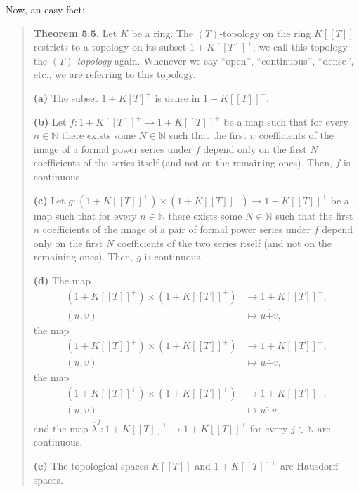\documentclass[numbers=enddot,12pt,final,onecolumn,notitlepage]{scrartcl}%
\begin{document}
Now, an easy fact:

\begin{quote}
\textbf{Theorem 5.5.} Let $K$ be a ring. The $\left(  T\right)  $-topology on
the ring $K\left[  \left[  T\right]  \right]  $ restricts to a topology on its
subset $1+K\left[  \left[  T\right]  \right]  ^{+}$; we call this topology the
$\left(  T\right)  $\textit{-topology} again. Whenever we say ``open'',
``continuous'', ``dense'', etc., we are referring to this topology.

\textbf{(a)} The subset $1+K\left[  T\right]  ^{+}$ is dense in $1+K\left[
\left[  T\right]  \right]  ^{+}$.

\textbf{(b)} Let $f:1+K\left[  \left[  T\right]  \right]  ^{+}\rightarrow
1+K\left[  \left[  T\right]  \right]  ^{+}$ be a map such that for every
$n\in\mathbb{N}$ there exists some $N\in\mathbb{N}$ such that the first $n$
coefficients of the image of a formal power series under $f$ depend only on
the first $N$ coefficients of the series itself (and not on the remaining
ones). Then, $f$ is continuous.

\textbf{(c)} Let $g:\left(  1+K\left[  \left[  T\right]  \right]  ^{+}\right)
\times\left(  1+K\left[  \left[  T\right]  \right]  ^{+}\right)
\rightarrow1+K\left[  \left[  T\right]  \right]  ^{+}$ be a map such that for
every $n\in\mathbb{N}$ there exists some $N\in\mathbb{N}$ such that the first
$n$ coefficients of the image of a pair of formal power series under $f$
depend only on the first $N$ coefficients of the two series itself (and not on
the remaining ones). Then, $g$ is continuous.

\textbf{(d)} The map%
\begin{align*}
\left(  1+K\left[  \left[  T\right]  \right]  ^{+}\right)  \times\left(
1+K\left[  \left[  T\right]  \right]  ^{+}\right)   &  \rightarrow1+K\left[
\left[  T\right]  \right]  ^{+},\\
\left(  u,v\right)   &  \mapsto u\widehat{+}v,
\end{align*}
the map%
\begin{align*}
\left(  1+K\left[  \left[  T\right]  \right]  ^{+}\right)  \times\left(
1+K\left[  \left[  T\right]  \right]  ^{+}\right)   &  \rightarrow1+K\left[
\left[  T\right]  \right]  ^{+},\\
\left(  u,v\right)   &  \mapsto u\widehat{-}v,
\end{align*}
the map%
\begin{align*}
\left(  1+K\left[  \left[  T\right]  \right]  ^{+}\right)  \times\left(
1+K\left[  \left[  T\right]  \right]  ^{+}\right)   &  \rightarrow1+K\left[
\left[  T\right]  \right]  ^{+},\\
\left(  u,v\right)   &  \mapsto u\widehat{\cdot}v,
\end{align*}
and the map $\widehat{\lambda}^{j}:1+K\left[  \left[  T\right]  \right]
^{+}\rightarrow1+K\left[  \left[  T\right]  \right]  ^{+}$ for every
$j\in\mathbb{N}$ are continuous.

\textbf{(e)} The topological spaces $K\left[  \left[  T\right]  \right]  $ and
$1+K\left[  \left[  T\right]  \right]  ^{+}$ are Hausdorff spaces.
\end{quote}
\end{document}
